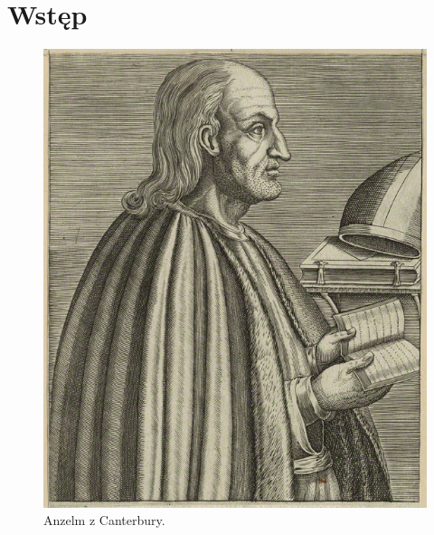 
\section{Wstęp}
\lipsum[1-3] \cite{greenwade93}
\begin{figure}[h]
	\label{fig:anzelm}
	\centering \includegraphics[width=0.7\linewidth]{img/anzelm.png}
	\caption{Anzelm z Canterbury.}
\end{figure}
\lipsum[3-4]
